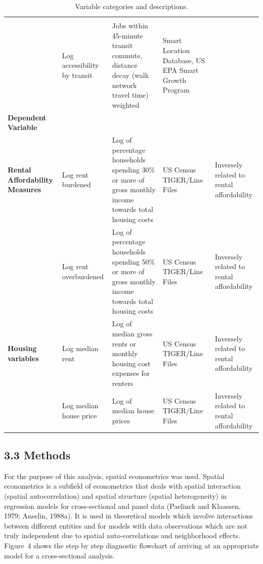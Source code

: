 \documentclass[10pt,letterpaper,onecolumn]{article}
\begin{document}
\begin{table}
\begin{tabular}{>{\raggedright}p{3cm} >{\raggedright}p{3cm} >{\raggedright}p{3.5cm} >{\raggedright}p{3cm} >{\raggedright\arraybackslash}p{3cm}}
  &\\
%
  & Log accessibility by transit
  & Jobs within 45-minute transit commute, distance decay (walk network travel time) weighted
  & Smart Location Database, US EPA Smart Growth Program
  &\\
%
\midrule
\textbf{Dependent Variable} & & & &\\
\midrule
%
\textbf{Rental Affordability Measures}
  & Log rent burdened
  & Log of percentage households spending 30\% or more of gross monthly income towards total housing costs
  & US Census TIGER/Line Files
  & Inversely related to rental affordability\\
%
~ & Log rent overburdened
  & Log of percentage households spending 50\% or more of gross monthly income towards total housing costs
  & US Census TIGER/Line Files
  & Inversely related to rental affordability\\
%
\textbf{Housing variables}
  & Log median rent
  & Log of median gross rents or monthly housing cost expenses for renters
  & US Census TIGER/Line Files
  & Inversely related to rental affordability\\
%
~ & Log median house price
  & Log of median house prices
  & US Census TIGER/Line Files
  & Inversely related to rental affordability\\
\bottomrule
\end{tabular}
\caption{Variable categories and descriptions.}
\end{table}

\subsection*{3.3 Methods}

For the purpose of this analysis, spatial econometrics was used. Spatial
econometrics is a subfield of econometrics that deals with spatial
interaction (spatial autocorrelation) and spatial structure (spatial
heterogeneity) in regression models for cross-sectional and panel data
(Paelinck and Klaassen, 1979; Anselin, 1988a). It is used in theoretical
models which involve interactions between different entities and for
models with data observations which are not truly independent due to
spatial auto-correlations and neighborhood effects. Figure~4 shows the
step by step diagnostic flowchart of arriving at an appropriate model
for a cross-sectional analysis.
\end{document}
